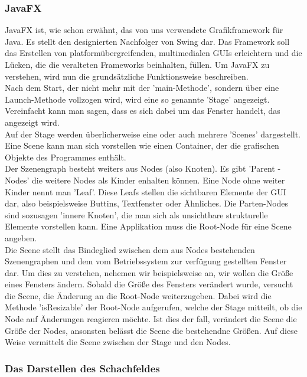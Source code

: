 \documentclass[12pt,a4paper]{article}
\begin{document}
{\subsubsection{JavaFX}
\label{SUBSUBSEC:JAVAFX}
JavaFX ist, wie schon erwähnt, das von uns verwendete Grafikframework für Java. Es stellt den designierten Nachfolger von Swing dar. Das Framework soll das Erstellen von platformübergreifenden, multimedialen GUIs erleichtern und die Lücken, die die veralteten Frameworks beinhalten, füllen.
Um JavaFX zu verstehen, wird nun die grundsätzliche Funktionsweise beschreiben.\\ [2ex]
Nach dem Start, der nicht mehr mit der 'main-Methode', sondern über eine Launch-Methode vollzogen wird, wird eine so genannte 'Stage' angezeigt. Vereinfacht kann man sagen, dass es sich dabei um das Fenster handelt, das angezeigt wird.\\
Auf der Stage werden überlicherweise eine oder auch mehrere 'Scenes' dargestellt. Eine Scene kann man sich vorstellen wie einen Container, der die grafischen Objekte des Programmes enthält. \\
Der Szenengraph besteht weiters aus Nodes (also Knoten). Es gibt 'Parent - Nodes' die weitere Nodes als Kinder enhalten können. Eine Node ohne weiter Kinder nennt man 'Leaf'. Diese Leafs stellen die sichtbaren Elemente der GUI dar, also beispielsweise Buttins, Textfenster oder Ähnliches. Die Parten-Nodes sind sozusagen 'innere Knoten', die man sich als unsichtbare strukturelle Elemente vorstellen kann. Eine Applikation muss die Root-Node für eine Scene angeben. \\
Die Scene stellt das Bindeglied zwischen dem aus Nodes bestehenden Szenengraphen und dem vom Betriebssystem zur verfügung gestellten Fenster dar. Um dies zu verstehen, nehemen wir beispielsweise an, wir wollen die Größe eines Fensters ändern. Sobald die Größe des Fensters verändert wurde, versucht die Scene, die Änderung an die Root-Node weiterzugeben. Dabei wird die Methode 'isResizable' der Root-Node aufgerufen, welche der Stage mitteilt, ob die Node auf Änderungen reagieren möchte. Ist dies der fall, verändert die Scene die Größe der Nodes, ansonsten belässt die Scene die bestehendne Größen. Auf diese Weise vermittelt die Scene zwischen der Stage und den Nodes. 

\subsubsection{Das Darstellen des Schachfeldes}
\label{SUBSUBSEC:BOARDGUI}

}
\end{document}
